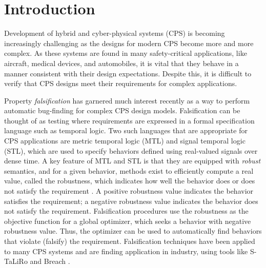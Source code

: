 \section{Introduction} \label{sec:introduction}

Development of hybrid and cyber-physical systems (CPS) is becoming
increasingly challenging as the designs for modern CPS become more and
more complex.  As these systems are found in many safety-critical
applications, like aircraft, medical devices, and automobiles, it is
vital that they behave in a manner consistent with their
design expectations. Despite this, it is difficult to verify that CPS
designs meet their requirements for complex applications.


Property \emph{falsification} has garnered much interest recently as a
way to perform automatic bug-finding for complex CPS design
models. Falsification can be thought of as testing where requirements are expressed 
in a formal specification language such as temporal logic.
Two such
languages that are appropriate for CPS applications are metric
temporal logic (MTL) and signal temporal logic (STL),
which are used to specify behaviors defined
using real-valued signals over dense time. A key feature of MTL and
STL is that they are equipped with \emph{robust} semantics, and for a given behavior, methods exist to efficiently compute a
real value, called the robustness, which indicates how well the
behavior does or does not satisfy the requirement
\cite{FainekosP06fates,DonzeM10}. A positive robustness value
indicates the behavior satisfies the requirement; a negative
robustness value indicates the behavior does not satisfy the
requirement. Falsification procedures use the robustness as the objective function
for a global optimizer, which seeks a
behavior with negative robustness value. Thus, the optimizer can
be used to automatically find behaviors that violate (falsify) the
requirement. Falsification techniques have been applied to many CPS
systems and are finding application in industry, using tools like
S-TaLiRo and Breach \cite{TaliroLFS11,BreachCAV10}. 

